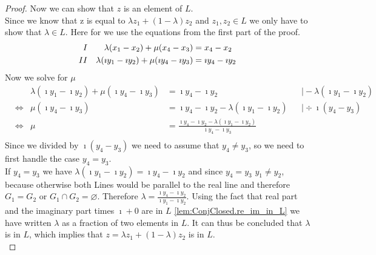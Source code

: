\begin{proof}
    Now we can show that $z$ is an element of $L$.\\
    Since we know that z is equal to $\lambda z_1 + (1-\lambda)z_2$ and $z_1, z_2 \in L$ we only have to show that $\lambda \in L$. Here for we use the equations from the first part of the proof.
    \begin{align*}
        \RNum{1} &&\lambda(x_1 - x_2)+\mu(x_4-x_3) &= x_4-x_2\\
        \RNum{2} &&\lambda(\imath y_1 - \imath y_2)+\mu(\imath y_4-\imath y_3) &= \imath y_4-\imath y_2
    \end{align*}
    Now we solve  for $\mu$ 
    \begin{align*}
        && \lambda(\imath y_1 - \imath y_2)+\mu(\imath y_4-\imath y_3) &= \imath y_4-\imath y_2 && \mid -\lambda(\imath y_1 - \imath y_2)\\
        &\Leftrightarrow & \mu(\imath y_4-\imath y_3) &= \imath y_4-\imath y_2 - \lambda(\imath y_1 - \imath y_2) && \mid \div \imath(y_4-y_3)\\
        &\Leftrightarrow & \mu &= \frac{\imath y_4-\imath y_2 - \lambda(\imath y_1 - \imath y_2)}{\imath y_4-\imath y_3}\\
    \end{align*}
    Since we divided by $\imath (y_4-y_3)$ we need to assume that $y_4 \ne y_3$, so we need to first handle the case $y_4 = y_3$.\\
    If $y_4 = y_3$ we have $\lambda(\imath y_1 - \imath y_2) = \imath y_4-\imath y_2$ and since $y_4 = y_3$ $y_1 \ne y_2$, because otherwise both Lines would be parallel to the real line and therefore $G_1 = G_2$ or $G_1 \cap G_2 = \varnothing$. 
    Therefore $\lambda = \frac{\imath y_4-\imath y_2}{\imath y_1 - \imath y_2}$. Using the fact that real part and the imaginary part times $\imath + 0$ are in $L$ \ref{lem:ConjClosed.re_im_in_L} we have written $\lambda$ as a fraction of two elements in $L$. 
    It can thus be concluded that $\lambda$ is in $L$, which implies that $z = \lambda z_1 + (1-\lambda)z_2$ is in $L$.\\
   

\end{proof}
